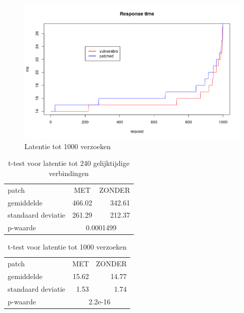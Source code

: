 \begin{figure}
	\includegraphics[width=1.0\linewidth]{img/ms_patched_vuln.png}
	\caption{Latentie tot 1000 verzoeken}
	\label{fig:ms_patched_vuln}
\end{figure}

\begin{table}[]
	\centering
	\caption{t-test voor latentie tot 240 gelijktijdige verbindingen}
	\label{t_ms_conc}
	\begin{tabular}{l|cr}
		\hline
		patch              & MET                        & \multicolumn{1}{c}{ZONDER} \\
		gemiddelde         & \multicolumn{1}{r}{466.02} & 342.61                     \\
		standaard deviatie & \multicolumn{1}{r}{261.29} & 212.37                     \\ \hline
		p-waarde           & \multicolumn{2}{c|}{0.0001499}                         
	\end{tabular}
\end{table}

\begin{table}[]
	\centering
	\caption{t-test voor latentie tot 1000 verzoeken}
	\label{t_ms_patched_vuln}
	\begin{tabular}{l|cr}
		\hline
		patch              & MET                       & \multicolumn{1}{c}{ZONDER} \\
		gemiddelde         & \multicolumn{1}{r}{15.62} & 14.77                      \\
		standaard deviatie & \multicolumn{1}{r}{1.53}  & 1.74                       \\ \hline
		p-waarde           & \multicolumn{2}{c|}{2.2e-16}                          
	\end{tabular}
\end{table}


